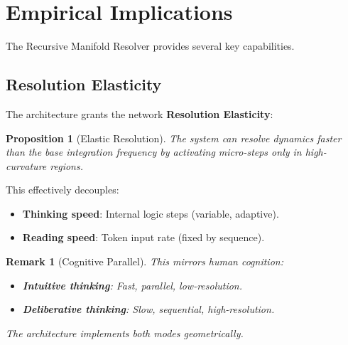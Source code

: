 \documentclass[12pt,letterpaper,twoside]{article}
\newtheorem{remarque}{Remark}[section]
\newtheorem{prop}{Proposition}[section]
\begin{document}
\section{Empirical Implications}

The Recursive Manifold Resolver provides several key capabilities.

\subsection{Resolution Elasticity}

The architecture grants the network \textbf{Resolution Elasticity}:

\begin{prop}[Elastic Resolution]
The system can resolve dynamics faster than the base integration frequency by activating micro-steps only in high-curvature regions.
\end{prop}

This effectively decouples:
\begin{itemize}
\item \textbf{Thinking speed}: Internal logic steps (variable, adaptive).
\item \textbf{Reading speed}: Token input rate (fixed by sequence).
\end{itemize}

\begin{remarque}[Cognitive Parallel]
This mirrors human cognition:
\begin{itemize}
\item \textbf{Intuitive thinking}: Fast, parallel, low-resolution.
\item \textbf{Deliberative thinking}: Slow, sequential, high-resolution.
\end{itemize}
The architecture implements both modes geometrically.
\end{remarque}
\end{document}
